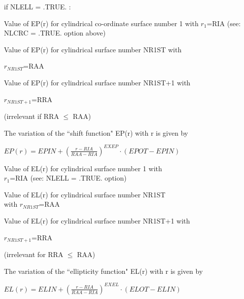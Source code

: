 if NLELL = .TRUE. :
\begin{list}{ }{}
\item[{\bf EPIN }]
Value of EP(r) for cylindrical co-ordinate surface number 1 with
$r_1$=RIA
(see: NLCRC = .TRUE. option above)
\item[{\bf EPOT }]
Value of EP(r) for cylindrical surface number NR1ST with

$r_{NR1ST}$=RAA
\item[{\bf EPCH }]
Value of EP(r) for cylindrical surface number NR1ST+1 with

$r_{NR1ST+1}$=RRA

(irrelevant if RRA $\le$ RAA)
\item[{\bf EXEP }]
The variation of the ``shift function" EP(r) with r is given by

$EP(r) = EPIN + { ( \frac{r - RIA}{RAA -
RIA} ) }^{EXEP}
\cdot (EPOT - EPIN)$
\item[{\bf ELIN }]
Value of EL(r) for cylindrical surface number 1 with \\
$r_1$=RIA (see: NLELL = .TRUE. option)
\item[{\bf ELOT }]
Value of EL(r) for cylindrical surface number NR1ST \\
with $r_{NR1ST}$=RAA
\item[{\bf ELCH }]
Value of EL(r) for cylindrical surface number NR1ST+1 with

$r_{NR1ST+1}$=RRA

(irrelevant for RRA $\le$ RAA)
\item[{\bf EXEL }]
The variation of the ``ellipticity function" EL(r) with
r is given by

$EL(r) = ELIN + { ( \frac{r - RIA}{RAA -
RIA} ) }^{EXEL}
\cdot (ELOT - ELIN)$
\end{list}

